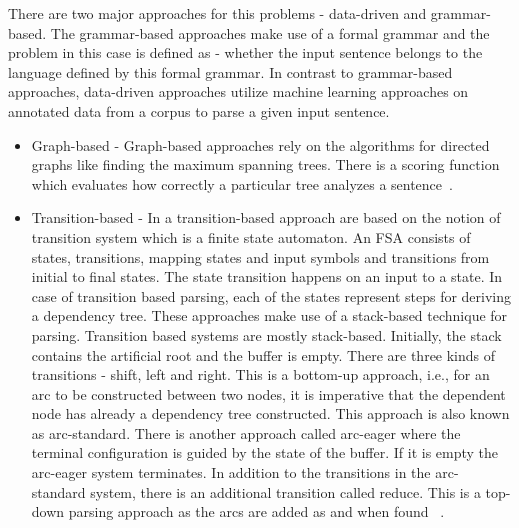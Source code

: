 There are two major approaches for this problems - data-driven and grammar-based. The grammar-based approaches make use of a formal grammar and the problem in this case is defined as - whether the input sentence belongs to the language defined by this formal grammar. In contrast to grammar-based approaches, data-driven approaches utilize machine learning approaches on annotated data from a corpus to parse a given input sentence. 

\begin{itemize}
    
    \item{Graph-based - }{Graph-based approaches rely on the algorithms for directed graphs like finding the maximum spanning trees. There is a scoring function which evaluates how correctly a particular tree analyzes a sentence~\citep{kubler2009dependency}. }
    
    \item{Transition-based - }{In a transition-based approach are based on the notion of transition system which is a finite state automaton. An FSA consists of states, transitions, mapping states and input symbols and transitions from initial to final states. The state transition happens on an input to a state. In case of transition based parsing, each of the states represent steps for deriving a dependency tree. These approaches make use of a stack-based technique for parsing. Transition based systems are mostly stack-based. Initially, the stack contains the artificial root and the buffer is empty. There are three kinds of transitions - shift, left and right. This is a bottom-up approach, i.e., for an arc to be constructed between two nodes, it is imperative that the dependent node has already a dependency tree constructed. This approach is also known as arc-standard. There is another approach called arc-eager where the terminal configuration is guided by the state of the buffer. If it is empty the arc-eager system terminates. In addition to the transitions in the arc-standard system, there is an additional transition called reduce. This is a top-down parsing approach as the arcs are added as and when found~ \citep{kubler2009dependency}.
    }
\end{itemize}
 
